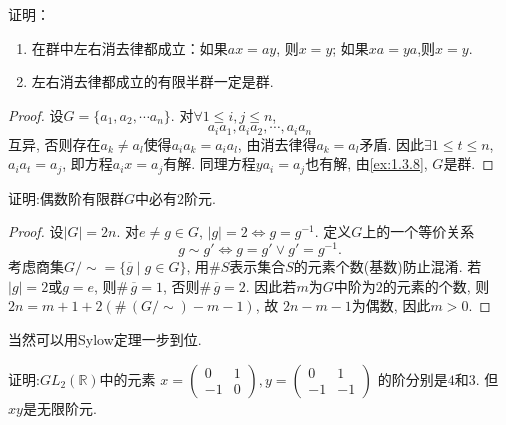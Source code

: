 \begin{problem}\label{ex:1.3.9}
    证明：
\begin{enumerate}[(1)]
    \item 在群中左右消去律都成立：如果$ax = ay$, 则$x = y$; 如果$xa = ya$,则$x = y$.
    \item 左右消去律都成立的有限半群一定是群.
\end{enumerate}
\end{problem}

\begin{proof}
    设$G = \{a_1, a_2, \cdots a_n\}$. 对$\forall 1 \leqslant i, j \leqslant n$,
\[
    a_ia_1, a_ia_2, \cdots, a_ia_n
\]
互异, 否则存在$a_k \neq a_l$使得$a_ia_k = a_ia_l$, 由消去律得$a_k = a_l$矛盾.
因此$\exists 1 \leqslant t \leqslant n$, $a_ia_t = a_j$, 即方程$a_ix = a_j$有解.
同理方程$ya_i = a_j$也有解, 由\ref{ex:1.3.8}, $G$是群.
\end{proof}

\begin{problem}
    证明:偶数阶有限群$G$中必有$2$阶元.
\end{problem}

\begin{proof}
    设$|G| = 2n$. 对$e \neq g \in G$, $|g| = 2 \iff g = g^{-1}$.
定义$G$上的一个等价关系
\[
    g \sim g' \iff g = g' \lor g' = g^{-1}.
\]
考虑商集$G/\sim = \{\overline{g} \mid g \in G\}$,
用$\#S$表示集合$S$的元素个数(基数)防止混淆.
若$|g| = 2$或$g = e$, 则$\#\, \overline{g} = 1$, 否则$\#\, \overline{g} = 2$.
因此若$m$为$G$中阶为$2$的元素的个数, 则$2n = m + 1 + 2(\#\, (G/\sim) - m - 1)$, 故
$2n - m - 1$为偶数, 因此$m > 0$.    
\end{proof}

\begin{remark}
    当然可以用Sylow定理一步到位.
\end{remark}

\begin{problem}
    证明:$GL_2(\mathbb{R})$中的元素
\(
x = \begin{pmatrix}
        0 & 1\\
        -1 & 0
\end{pmatrix}, 
y = \begin{pmatrix}
        0 & 1\\
        -1 & -1
\end{pmatrix}
\)
的阶分别是$4$和$3$. 但$xy$是无限阶元.
\end{problem}

